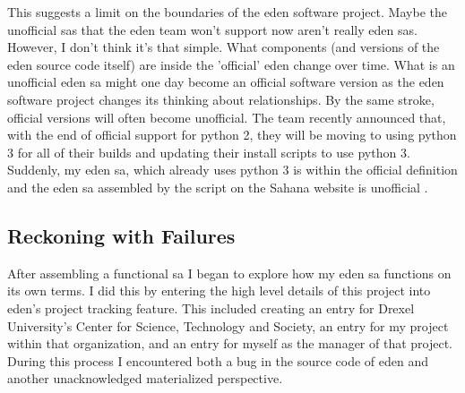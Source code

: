 \documentclass[a4paper,man,natbib,floatsintext]{apa6}
\begin{document}
   This suggests a limit on the boundaries of the \acrshort{eden} software project. Maybe the unofficial \glspl{sa} that the \acrshort{eden} team won't support now aren't really \acrshort{eden} \glspl{sa}. However, I don't think it's that simple. What components (and versions of the \acrshort{eden} source code itself) are inside the 'official' \acrshort{eden} change over time. What is an unofficial \acrshort{eden} \gls{sa} might one day become an official software version as the \acrshort{eden} software project changes its thinking about relationships. By the same stroke, official versions will often become unofficial. The team recently announced that, with the end of official support for \gls{python} 2, they will be moving to using \gls{python} 3 for all of their builds and updating their install scripts to use \gls{python} 3. Suddenly, my \acrshort{eden} \gls{sa}, which already uses \gls{python} 3 is within the official definition and the \acrshort{eden} \gls{sa} assembled by the script on the Sahana website is unofficial \citep{Konig2019-ya,Sahana_Foundation2015-zs}. 


   \subsection{Reckoning with Failures}
   After assembling a functional \gls{sa} I began to explore how my \acrshort{eden} \gls{sa} functions on its own terms. I did this by entering the high level details of this project into \acrshort{eden}'s project tracking feature. This included creating an entry for Drexel University's Center for Science, Technology and Society, an entry for my project within that organization, and an entry for myself as the manager of that project. During this process I encountered both a bug in the source code of \acrshort{eden} and another unacknowledged materialized perspective. 
\end{document}

